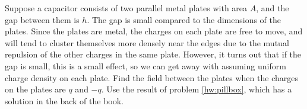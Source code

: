 Suppose a capacitor consists of two parallel metal plates with area
$A$, and the gap between them is $h$. The gap is small compared to the
dimensions of the plates. Since the plates are metal, the charges on
each plate are free to move, and will tend to cluster themselves more
densely near the edges due to the mutual repulsion of the other
charges in the same plate. However, it turns out that if the gap is
small, this is a small effect, so we can get away with assuming
uniform charge density on each plate.  Find the field between the
plates when the charges on the plates are $q$ and $-q$. Use the result
of problem \ref{hw:pillbox}, which has a solution in the back of the
book.\answercheck
